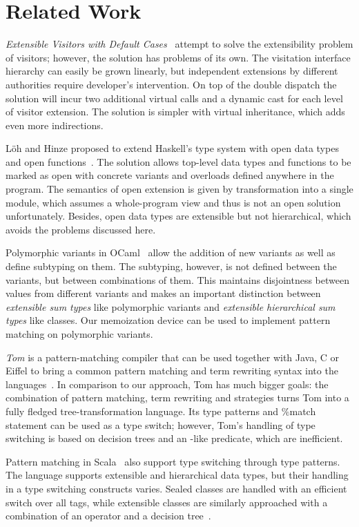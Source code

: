 \section{Related Work} %
\label{sec:rw}

\emph{Extensible Visitors with Default Cases}~\cite[]{Zenger:2001} attempt to solve the extensibility problem of visitors; 
however, the solution has problems of its own. The visitation interface 
hierarchy can easily be grown linearly, but independent extensions by different  
authorities require developer's intervention. On top of the double dispatch the 
solution will incur two additional virtual calls and a dynamic cast for each 
level of visitor extension. The solution is simpler with virtual inheritance, 
which adds even more indirections.

L\"{o}h and Hinze proposed to extend Haskell's type system with open data types 
and open functions~\cite{LohHinze2006}. The solution allows top-level data types 
and functions to be marked as open with concrete variants and overloads defined 
anywhere in the program. The semantics of open extension is given by 
transformation into a single module, which assumes a whole-program view and thus 
is not an open solution unfortunately. Besides, open data types are extensible but not 
hierarchical, which avoids the problems discussed here.

Polymorphic variants in OCaml~\cite{garrigue-98} allow the addition of new 
variants as well as define subtyping on them. The subtyping, however, is not 
defined between the variants, but between combinations of them. 
This maintains disjointness between values from different variants and makes an 
important distinction between \emph{extensible sum types} like polymorphic 
variants and \emph{extensible hierarchical sum types} like classes. Our 
memoization device can be used to implement pattern matching on polymorphic 
variants.

\emph{Tom} is a pattern-matching compiler that can be used together with Java, C or 
Eiffel to bring a common pattern matching and term rewriting syntax into the 
languages~\cite{Moreau:2003}. In comparison to our approach, Tom has much bigger 
goals: the combination of pattern matching, term rewriting and strategies turns 
Tom into a fully fledged tree-transformation language. Its type patterns and \%match 
statement can be used as a type switch; however, Tom's handling of type 
switching is based on decision trees and an -like predicate, 
which are inefficient.

Pattern matching in Scala~\cite{Scala2nd} also support type switching through 
type patterns. The language supports extensible and hierarchical data types, but
their handling in a type switching constructs varies. Sealed classes are handled 
with an efficient switch over all tags, while extensible classes are similarly 
approached with a combination of an  operator and a decision 
tree~\cite{EmirThesis}.